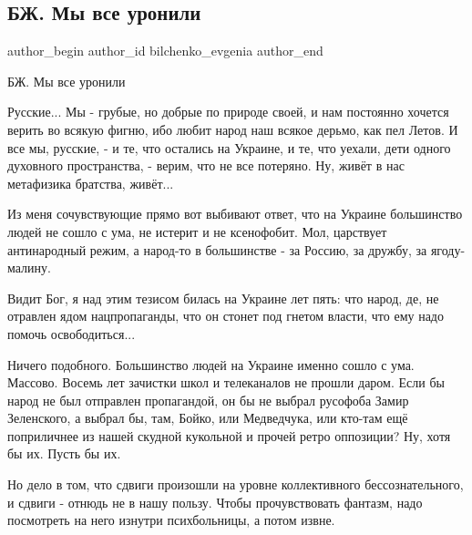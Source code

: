  
 
 
 
 
\subsection{БЖ. Мы все уронили}
\label{sec:05_01_2022.tg.bilchenko_evgenia.1.my_vse_uronili}

\ifcmt
 author_begin
   author_id bilchenko_evgenia
 author_end
\fi

БЖ. Мы все уронили

Русские... Мы - грубые, но добрые по природе своей, и нам постоянно хочется
верить во всякую фигню, ибо любит народ наш всякое дерьмо, как пел Летов. И все
мы, русские, - и те, что остались на Украине, и те, что уехали, дети одного
духовного пространства, - верим, что не все потеряно. Ну, живёт в нас
метафизика братства, живёт...


Из меня сочувствующие прямо вот выбивают ответ, что на Украине большинство
людей не сошло с ума, не истерит и не ксенофобит. Мол, царствует антинародный
режим, а народ-то в большинстве - за Россию, за дружбу, за ягоду- малину.

Видит Бог, я над этим тезисом билась на Украине лет пять: что народ, де, не
отравлен ядом нацпропаганды, что он стонет под гнетом власти, что ему надо
помочь освободиться...

Ничего подобного. Большинство людей на Украине именно сошло с ума. Массово.
Восемь лет зачистки школ и телеканалов не прошли даром. Если бы народ не был
отправлен пропагандой, он бы не выбрал русофоба Замир  Зеленского, а выбрал бы,
там, Бойко, или Медведчука, или кто-там ещё поприличнее из нашей скудной
кукольной и прочей ретро оппозиции? Ну, хотя бы их. Пусть бы их.

Но дело в том, что сдвиги произошли на уровне коллективного бессознательного, и
сдвиги - отнюдь не в нашу пользу. Чтобы прочувствовать фантазм, надо посмотреть
на него изнутри психбольницы, а потом извне.

